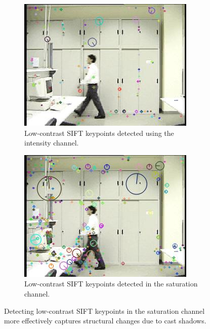 \documentclass[12pt]{report}
\begin{document}
\begin{figure}
  \centering
  \begin{subfigure}{.75\linewidth}
  \includegraphics[width=1\linewidth]{figures/lab_lowc_rgb_0161.jpg}
  \caption{Low-contrast SIFT keypoints detected using the intensity channel.}
\end{subfigure}
\hfill
\begin{subfigure}{.75\linewidth}
  \includegraphics[width=1\linewidth]{figures/lab_lowc_sat_0161.jpg}
  \caption{Low-contrast SIFT keypoints detected in the saturation channel.}
\end{subfigure}

\caption{Detecting low-contrast SIFT keypoints in the saturation channel more effectively captures structural changes due to cast shadows.}
\label{fig:sat_lowc_kp}
\end{figure}
\end{document}
